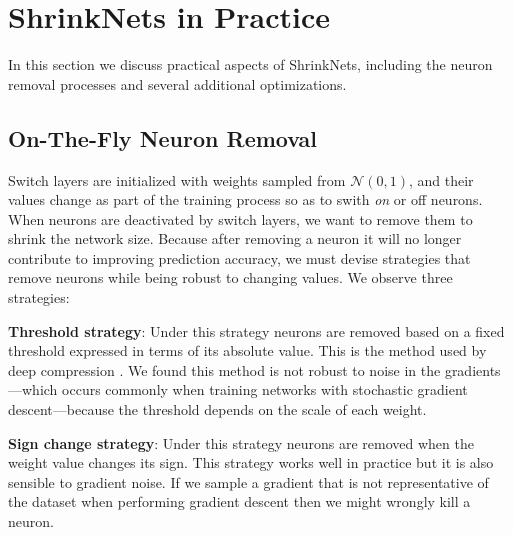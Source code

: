 
\section{ShrinkNets in Practice}

In this section we discuss practical aspects of ShrinkNets, including the neuron removal 
processes and several additional optimizations.


\subsection{On-The-Fly Neuron Removal}
\label{neuron_killing}

Switch layers are initialized with weights sampled from $\mathcal{N}(0,1)$, and
their values change as part of the training process so as to swith \emph{on} or
{off} neurons. When neurons are deactivated by switch layers, we want to remove
them to shrink the network size. Because after removing a neuron it will no
longer contribute to improving prediction accuracy, we must devise strategies
that remove neurons while being robust to changing values. We observe three
strategies:

\textbf{Threshold strategy}: Under this strategy neurons are removed based on a
fixed threshold expressed in terms of its absolute value. This is the method
used by deep compression \cite{}. We found this method is not robust to noise in
the gradients---which occurs commonly when training networks with stochastic
gradient descent---because the threshold depends on the scale of each weight.

\textbf{Sign change strategy}: Under this strategy neurons are removed when the
weight value changes its sign. This strategy works well in practice but it is
also sensible to gradient noise.  If
we sample a gradient that is not representative of the dataset when performing
gradient descent then we might wrongly kill a neuron.

